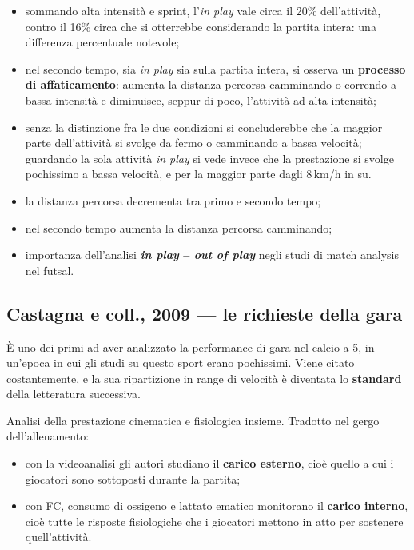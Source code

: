 \begin{itemize}
  \item sommando alta intensità e sprint, l'\textit{in play} vale circa il 20\% dell'attività,
    contro il 16\% circa che si otterrebbe considerando la partita intera: una differenza
    percentuale notevole;
  \item nel secondo tempo, sia \textit{in play} sia sulla partita intera, si osserva un
    \textbf{processo di affaticamento}: aumenta la distanza percorsa camminando o correndo a bassa
    intensità e diminuisce, seppur di poco, l'attività ad alta intensità;
  \item senza la distinzione fra le due condizioni si concluderebbe che la maggior parte
    dell'attività si svolge da fermo o camminando a bassa velocità; guardando la sola attività
    \textit{in play} si vede invece che la prestazione si svolge pochissimo a bassa velocità, e per
    la maggior parte dagli 8\,km/h in su.
\end{itemize}

\begin{itemize}
  \item la distanza percorsa decrementa tra primo e secondo tempo;
  \item nel secondo tempo aumenta la distanza percorsa camminando;
  \item importanza dell'analisi \textbf{\textit{in play} -- \textit{out of play}} negli studi di
    match analysis nel futsal.
\end{itemize}

\subsection{Castagna e coll., 2009 --- le richieste della gara}

È uno dei primi ad aver analizzato la performance di gara nel calcio a 5, in un'epoca in cui gli
studi su questo sport erano pochissimi. Viene citato costantemente, e la sua ripartizione in range
di velocità è diventata lo \textbf{standard} della letteratura successiva.

Analisi della prestazione cinematica e fisiologica insieme. Tradotto nel gergo dell'allenamento:
\begin{itemize}
  \item con la videoanalisi gli autori studiano il \textbf{carico esterno}, cioè quello a cui i
    giocatori sono sottoposti durante la partita;
  \item con FC, consumo di ossigeno e lattato ematico monitorano il \textbf{carico interno}, cioè
    tutte le risposte fisiologiche che i giocatori mettono in atto per sostenere quell'attività.
\end{itemize}

